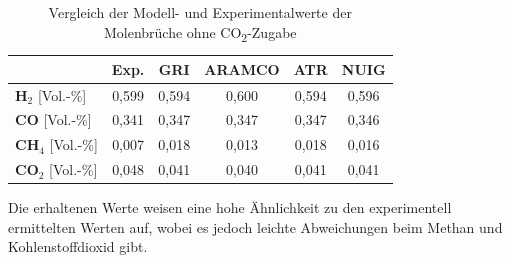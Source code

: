 \documentclass[footmark=none]{tubaf-thesis}
\begin{document}
        \begin{table}[H]
            \centering
            \caption{Vergleich der Modell- und Experimentalwerte der Molenbrüche ohne CO\textsubscript{2}-Zugabe}
            \label{tab:vergleich_abgaszusammensetzung_keinco2}
            \begin{tabular}{lccccc}
                \toprule
                & \textbf{Exp.} & \textbf{GRI} & \textbf{ARAMCO} & \textbf{ATR} & \textbf{NUIG} \\
                \midrule
                \textbf{H$_2$} [Vol.-\%] & 0,599 & 0,594 & 0,600 & 0,594 & 0,596 \\
                \textbf{CO} [Vol.-\%]& 0,341 & 0,347 & 0,347 & 0,347 & 0,346 \\
                \textbf{CH$_4$} [Vol.-\%]& 0,007 & 0,018 & 0,013 & 0,018 & 0,016 \\
                \textbf{CO$_2$} [Vol.-\%]& 0,048 & 0,041 & 0,040 & 0,041 & 0,041 \\
                \bottomrule
            \end{tabular}
        \end{table}
        Die erhaltenen Werte weisen eine hohe Ähnlichkeit zu den experimentell ermittelten Werten auf, wobei es jedoch leichte Abweichungen beim Methan und Kohlenstoffdioxid gibt. 
\end{document}
